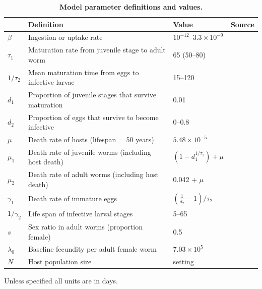 \begin{table}[!ht]
\centering
\caption[STH model parameters.]{
{\bf Model parameter definitions and values.}}
\begin{tabular}{|l|l|l|l|}
\hline
\multicolumn{1}{|l|}{\bf} & \multicolumn{1}{|l|}{\bf Definition} &
\multicolumn{1}{|l|}{\bf Value} &
\multicolumn{1}{|l|}{\bf Source} \\ \hline
$\beta$ & Ingestion or uptake rate & $10^{-12}$--$3.3\times10^{-9}$ & \\ \hline
$\tau_1$ & Maturation rate from juvenile stage to adult worm & 65 (50--80) & \cite{Anderson1992} \\ \hline
$1/\tau_2$ & Mean maturation time from eggs to infective larvae & 15--120 & \cite{Wagner,Arene,Kim} \\ \hline
$d_1$ & Proportion of juvenile stages that survive maturation & 0.01 & \cite{Anderson1992} \\ \hline
$d_2$ & Proportion of eggs that survive to become infective & 0--0.8 & \cite{Arene} \\ \hline
$\mu$ & Death rate of hosts (lifespan = 50 years) & $5.48\times 10^{-5}$  &  \\ \hline
$\mu_1$ & Death rate of juvenile worms (including host death) & $(1-d_1^{1/\tau_1}) + \mu$ &  \\ \hline
$\mu_2$ & Death rate of adult worms (including host death) & 0.042 + $\mu$ & \cite{Anderson1992} \\ \hline
$\gamma_1$ & Death rate of immature eggs & $(\frac{1}{d_2}-1)/\tau_2$ &  \\ \hline
$1/\gamma_2$ & Life span of infective larval stages & 5--65 & \cite{Arene} \\ \hline
$s$ & Sex ratio in adult worms (proportion female) & 0.5 & \cite{Anderson1992} \\ \hline
$\lambda_0$ & Baseline fecundity per adult female worm & $7.03\times 10^5$ & \cite{Churcher} \\ \hline
$N$ & Host population size & setting & \\ \hline
\end{tabular}
\begin{flushleft} Unless specified all units are in days.
\end{flushleft}
\label{table:paramSTH}
\end{table}

